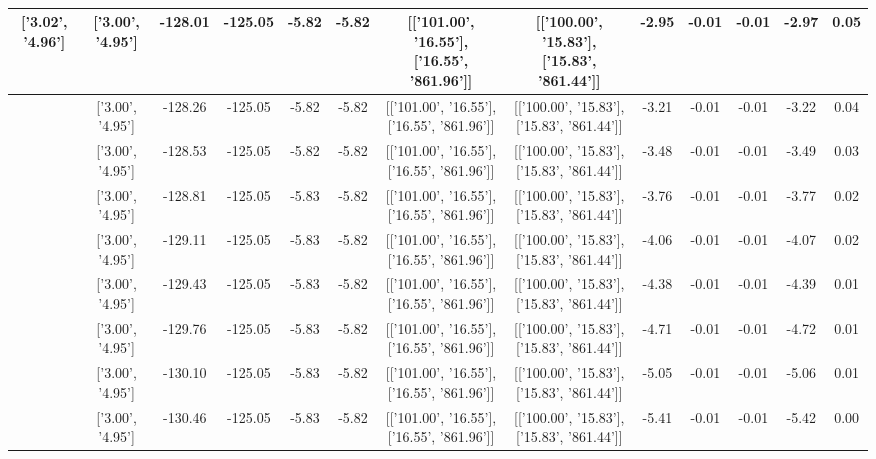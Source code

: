 \begin{table}[htbp]
\begin{adjustbox}{angle=90}
\begin{tabular}{|c|c|c|c|c|c|c|c|c|c|c|c|c|}
 ['3.02', '4.96'] & ['3.00', '4.95'] & -128.01 & -125.05 & -5.82 & -5.82 & [['101.00', '16.55'], ['16.55', '861.96']] & [['100.00', '15.83'], ['15.83', '861.44']] & -2.95 & -0.01 & -0.01 & -2.97 & 0.05\\ \hline
 ['3.02', '4.96'] & ['3.00', '4.95'] & -128.26 & -125.05 & -5.82 & -5.82 & [['101.00', '16.55'], ['16.55', '861.96']] & [['100.00', '15.83'], ['15.83', '861.44']] & -3.21 & -0.01 & -0.01 & -3.22 & 0.04\\ \hline
 ['3.02', '4.96'] & ['3.00', '4.95'] & -128.53 & -125.05 & -5.82 & -5.82 & [['101.00', '16.55'], ['16.55', '861.96']] & [['100.00', '15.83'], ['15.83', '861.44']] & -3.48 & -0.01 & -0.01 & -3.49 & 0.03\\ \hline
 ['3.02', '4.96'] & ['3.00', '4.95'] & -128.81 & -125.05 & -5.83 & -5.82 & [['101.00', '16.55'], ['16.55', '861.96']] & [['100.00', '15.83'], ['15.83', '861.44']] & -3.76 & -0.01 & -0.01 & -3.77 & 0.02\\ \hline
 ['3.02', '4.96'] & ['3.00', '4.95'] & -129.11 & -125.05 & -5.83 & -5.82 & [['101.00', '16.55'], ['16.55', '861.96']] & [['100.00', '15.83'], ['15.83', '861.44']] & -4.06 & -0.01 & -0.01 & -4.07 & 0.02\\ \hline
 ['3.03', '4.96'] & ['3.00', '4.95'] & -129.43 & -125.05 & -5.83 & -5.82 & [['101.00', '16.55'], ['16.55', '861.96']] & [['100.00', '15.83'], ['15.83', '861.44']] & -4.38 & -0.01 & -0.01 & -4.39 & 0.01\\ \hline
 ['3.03', '4.96'] & ['3.00', '4.95'] & -129.76 & -125.05 & -5.83 & -5.82 & [['101.00', '16.55'], ['16.55', '861.96']] & [['100.00', '15.83'], ['15.83', '861.44']] & -4.71 & -0.01 & -0.01 & -4.72 & 0.01\\ \hline
 ['3.03', '4.96'] & ['3.00', '4.95'] & -130.10 & -125.05 & -5.83 & -5.82 & [['101.00', '16.55'], ['16.55', '861.96']] & [['100.00', '15.83'], ['15.83', '861.44']] & -5.05 & -0.01 & -0.01 & -5.06 & 0.01\\ \hline
 ['3.03', '4.96'] & ['3.00', '4.95'] & -130.46 & -125.05 & -5.83 & -5.82 & [['101.00', '16.55'], ['16.55', '861.96']] & [['100.00', '15.83'], ['15.83', '861.44']] & -5.41 & -0.01 & -0.01 & -5.42 & 0.00\\ \hline
            \end{tabular}
        \end{adjustbox}
        \caption{}
        \label{}
    \end{table}
    